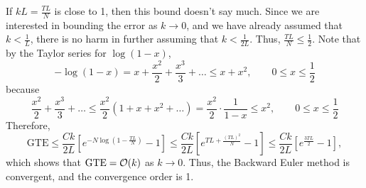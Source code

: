 \documentclass{homework}
\begin{document}
	If $kL = \frac{TL}{N}$ is close to 1, then this bound doesn't say much. Since we are interested in bounding the error as $k \to 0$, and we have already assumed that $k < \frac{1}{L}$, there is no harm in further assuming that $k < \frac{1}{2L}$. Thus, $\frac{TL}{N} \le \frac{1}{2}$. Note that by the Taylor series for $\log(1-x)$,
	\begin{equation*}
		-\log(1-x) = x + \frac{x^2}{2} + \frac{x^3}{3} + \dots \le x + x^2, \qquad 0 \le x \le \frac{1}{2}
	\end{equation*}
	because
	\begin{equation*}
		\frac{x^2}{2} + \frac{x^3}{3} + \dots \le \frac{x^2}{2}\left(1 + x + x^2 + \dots\right) = \frac{x^2}{2}\cdot\frac{1}{1-x} \le x^2, \qquad 0 \le x \le \frac{1}{2}
	\end{equation*}
	Therefore,
	\begin{equation*}
		\text{GTE} \le \frac{Ck}{2L}\left[e^{-N\log\left(1-\frac{TL}{N}\right)} - 1\right] \le \frac{Ck}{2L}\left[e^{TL + \frac{(TL)^2}{N}} - 1\right] \le \frac{Ck}{2L}\left[e^{\frac{3TL}{2}} - 1\right],
	\end{equation*}
	which shows that $\text{GTE} = \mathcal{O}(k)$ as $k \to 0$. Thus, the Backward Euler method is convergent, and the convergence order is 1.
\end{document}
